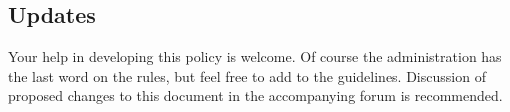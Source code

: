 \subsection*{Updates}

Your help in developing this policy is welcome. Of course the administration has the last word on the rules, but feel free to add to the guidelines. Discussion of proposed changes to this document in the accompanying forum is recommended.
